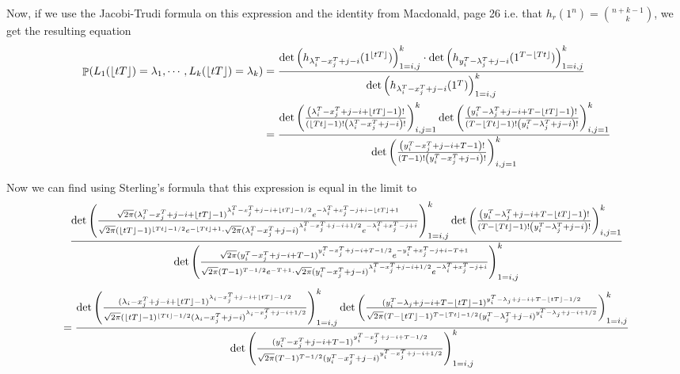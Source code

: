 \documentclass[12pt]{article}
\DeclareMathOperator{\pr}{\mathbb{P}}
\DeclarePairedDelimiter\floor{\lfloor}{\rfloor}
\begin{document}
Now, if we use the Jacobi-Trudi formula on this expression and the identity from Macdonald, page 26 i.e. that $h_r(1^n)=\binom{n+k-1}{k}$, we get the resulting equation 
\begin{align*}
\pr(L_1(\lfloor tT\rfloor)=\lambda_1,\cdots, L_k(\lfloor tT\rfloor)=\lambda_k)
&=\frac{\det\left(h_{\lambda_i^T-x_j^T+j-i}(1^{\floor{tT}})\right)_{1=i,j}^k\cdot\det\left(h_{y_i^T-\lambda_j^T+j-i}(1^{T-\floor{Tt}})\right)_{1=i,j}^k}{\det\left(h_{\lambda_i^T-x_j^T+j-i}(1^T)\right)_{1=i,j}^k}\\
&=\frac{\det\left(\frac{\left(\lambda_i^T-x_j^T+j-i+\floor{tT}-1\right)!}{\left(\floor{Tt}-1\right)!\left(\lambda_i^T-x_j^T+j-i\right)!}\right)_{i,j=1}^k\det\left(\frac{\left(y_i^T-\lambda_j^T+j-i+T-\floor{tT}-1\right)!}{\left(T-\floor{Tt}-1\right)!\left(y_i^T-\lambda_j^T+j-i\right)!}\right)_{i,j=1}^k}{\det\left(\frac{\left(y_i^T-x_j^T+j-i+T-1\right)!}{\left(T-1\right)!\left(y_i^T-x_j^T+j-i\right)!}\right)_{i,j=1}^k}
\end{align*}

Now we can find using Sterling's formula that this expression is equal in the limit to 
\[
\frac{\det\left(\frac{\sqrt{2\pi}(\lambda_i^T-x_j^T+j-i+\floor{tT}-1)^{\lambda_i^T-x_j^T+j-i+\floor{tT}-1/2}e^{-\lambda_i^T+x_j^T-j+i-\floor{tT}+1}}{\sqrt{2\pi}(\floor{tT}-1)^{\floor{Tt}-1/2}e^{-\floor{Tt}+1}\cdot \sqrt{2\pi}(\lambda_i^T-x_j^T+j-i)^{\lambda_i^T-x_j^T+j-i+1/2}e^{-\lambda_i^T+x_j^T-j+i}}\right)_{1=i,j}^k
\det\left(\frac{\left(y_i^T-\lambda_j^T+j-i+T-\floor{tT}-1\right)!}{\left(T-\floor{Tt}-1\right)!\left(y_i^T-\lambda_j^T+j-i\right)!}\right)_{i,j=1}^k}
{\det\left(\frac{\sqrt{2\pi}(y_i^T-x_j^T+j-i+{T}-1)^{y_i^T-x_j^T+j-i+{T}-1/2}e^{-y_i^T+x_j^T-j+i-{T}+1}}{\sqrt{2\pi}({T}-1)^{{T}-1/2}e^{-{T}+1}\cdot \sqrt{2\pi}(y_i^T-x_j^T+j-i)^{\lambda_i^T-x_j^T+j-i+1/2}e^{-\lambda_i^T+x_j^T-j+i}}\right)_{1=i,j}^k}
\]
\[
=\frac{
	\det\left(\frac{
		(\lambda_i-x_j^T+j-i+\floor{tT}-1)^{\lambda_i-x_j^T+j-i+\floor{tT}-1/2}}{\sqrt{2\pi}(\floor{tT}-1)^{\floor{Tt}-1/2}(\lambda_i-x_j^T+j-i)^{\lambda_i-x_j^T+j-i+1/2}}\right)_{1=i,j}^k
	\det\left(\frac{(y_i^T-\lambda_j+j-i+T-\floor{tT}-1)^{y_i^T-\lambda_j+j-i+T-\floor{tT}-1/2}}{\sqrt{2\pi}(T-\floor{tT}-1)^{T-\floor{Tt}-1/2}(y_i^T-\lambda_j^T+j-i)^{y_i^T-\lambda_j+j-i+1/2}}\right)_{1=i,j}^k
	}
{\det\left(\frac{
		(y_i^T-x_j^T+j-i+T-1)^{y_i^T-x_j^T+j-i+{T}-1/2}}{\sqrt{2\pi}(T-1)^{T-1/2}(y_i^T-x_j^T+j-i)^{y_i^T-x_j^T+j-i+1/2}}\right)_{1=i,j}^k}
\]
\end{document}
